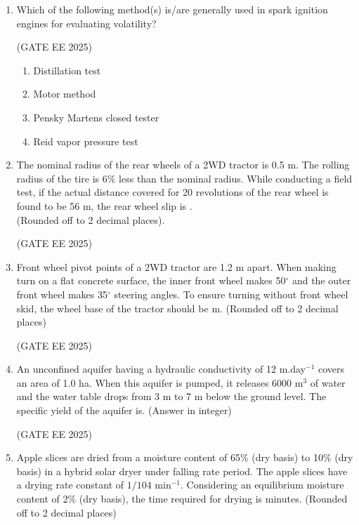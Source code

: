 \documentclass[journal,12pt,onecolumn]{IEEEtran}
\theoremstyle{remark}
\begin{document}
\begin{enumerate}
\item Which of the following method(s) is/are generally used in spark ignition engines for evaluating volatility?

\hfill(GATE EE 2025)

\begin{multicols}{2}
\begin{enumerate}
\item Distillation test
\item Motor method
\item Pensky Martens closed tester
\item Reid vapor pressure test
\end{enumerate}
\end{multicols}

\item The nominal radius of the rear wheels of a 2WD tractor is 0.5 m. The rolling radius of the tire is 6\% less than the nominal radius. While conducting a field test, if the actual distance covered for 20 revolutions of the rear wheel is found to be 56 m, the rear wheel slip is \underline{\hspace{2cm}}.\\(Rounded off to 2 decimal places).

\hfill(GATE EE 2025)

\item Front wheel pivot points of a 2WD tractor are 1.2 m apart. When making turn on a flat concrete surface, the inner front wheel makes 50$^\circ$ and the outer front wheel makes 35$^\circ$ steering angles. To ensure turning without front wheel skid, the wheel base of the tractor should be \underline{\hspace{2cm}}m. (Rounded off to 2 decimal places)

\hfill(GATE EE 2025)

\item An unconfined aquifer having a hydraulic conductivity of 12 m.day$^{-1}$ covers an area of 1.0 ha. When this aquifer is pumped, it releases 6000 m$^3$ of water and the water table drops from 3 m to 7 m below the ground level. The specific yield of the aquifer is\underline{\hspace{2cm}}. (Answer in integer)

\hfill(GATE EE 2025)

\item Apple slices are dried from a moisture content of 65\% (dry basis) to 10\% (dry basis) in a hybrid solar dryer under falling rate period. The apple slices have a drying rate constant of $1/104$ min$^{-1}$. Considering an equilibrium moisture content of 2\% (dry basis), the time required for drying is \underline{\hspace{2cm}} minutes. (Rounded off to 2 decimal places)


\end{enumerate}
\end{document}
